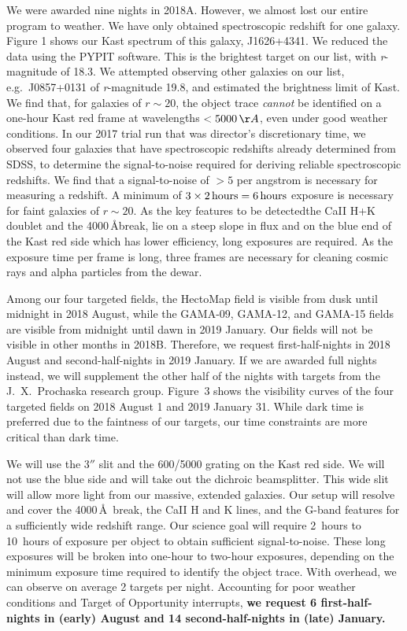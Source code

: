 \documentclass[letterpaper,12pt]{article}
\begin{document}
We were awarded nine nights in 2018A. However, we almost lost our entire program to weather. We have only obtained 
spectroscopic redshift for one galaxy. Figure 1 shows our Kast spectrum of this galaxy, J1626+4341. We reduced the data 
using the PYPIT software. This is the brightest target on our list, with {\it r}-magnitude of 18.3. We attempted 
observing other galaxies on our list, e.g.\ J0857+0131 of {\it r}-magnitude 19.8, and estimated the brightness limit of 
Kast. We find that, for galaxies of $r\sim20$, the object trace 
{\it cannot} be identified on a one-hour Kast red frame at wavelengths $<5000\,\AA$, even under good weather conditions. 
In our 2017 trial run that was director's discretionary time, we observed 
four galaxies that have spectroscopic redshifts already determined from SDSS, to determine the signal-to-noise required 
for deriving reliable spectroscopic redshifts. We find that a signal-to-noise of $>5$ per angstrom is necessary for 
measuring a redshift. A minimum of 
$3\times2\,{\rm hours}=6\,{\rm hours}$ exposure is necessary for faint galaxies of $r\sim20$. As the key features to 
be detected{\textemdash}the CaII H+K doublet and the 4000\,\AA break, 
lie on a steep slope in flux and on the blue end of the Kast red side which has lower efficiency, long exposures are 
required. As the exposure time per frame is long, three frames are necessary for cleaning cosmic rays and alpha particles 
from the dewar. 

Among our four targeted fields, the HectoMap field is visible from dusk until midnight in 2018 August, while the GAMA-09, 
GAMA-12, and GAMA-15 fields are visible from midnight until dawn in 2019 January. Our fields will not be visible in 
other months in 2018B. Therefore, we request first-half-nights in 2018 August and second-half-nights in 2019 January. If 
we are awarded full nights instead, we will supplement the other half of the nights with targets from the J.\ X.\ 
Prochaska research group. Figure~3 shows the visibility curves of the four targeted fields on 2018 August 1 and 2019 
January 31. While dark time is preferred due to the faintness of our targets, our time constraints are more 
critical than dark time.  

We will use the $3''$ slit and the 600/5000 grating on the Kast red side. We will not use the blue side and will take 
out the dichroic beamsplitter. This wide slit will allow more light from our massive, extended galaxies. Our setup will 
resolve and cover the 4000\,\AA\ break, the CaII H and K lines, and the G-band features for a sufficiently wide 
redshift range. 
Our science goal will require 2~hours to 10~hours of exposure per object to obtain sufficient signal-to-noise. These 
long exposures will be broken into one-hour to two-hour exposures, depending on the minimum exposure time required to 
identify the object trace. With overhead, we can observe on average 2 targets per night. Accounting for poor weather 
conditions and Target of Opportunity interrupts, {\bf we request 6 first-half-nights in (early) August and 14 
second-half-nights in (late) January.}
\end{document}
